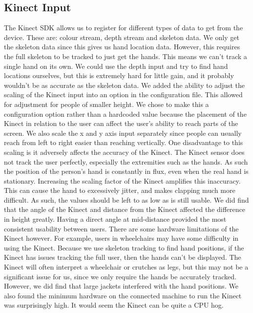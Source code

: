 \subsection{Kinect Input}
The Kinect SDK allows us to register for different types of data to get from the device. These are: colour stream, depth stream and skeleton data. We only get the skeleton data since this gives us hand location data. However, this requires the full skeleton to be tracked to just get the hands. This means we can't track a single hand on its own. We could use the depth input and try to find hand locations ourselves, but this is extremely hard for little gain, and it probably wouldn't be as accurate as the skeleton data.
We added the ability to adjust the scaling of the Kinect input into an option in the configuration file. This allowed for adjustment for people of smaller height. We chose to make this a configuration option rather than a hardcoded value because the placement of the Kinect in relation to the user can affect the user's ability to reach parts of the screen. We also scale the x and y axis input separately since people can usually reach from left to right easier than reaching vertically.
One disadvantage to this scaling is it adversely affects the accuracy of the Kinect. The Kinect sensor does not track the user perfectly, especially the extremities such as the hands. As such the position of the person's hand is constantly in flux, even when the real hand is stationary. Increasing the scaling factor of the Kinect amplifies this inaccuracy. This can cause the hand to excessively jitter, and makes clapping much more difficult. As such, the values should be left to as low as is still usable.
We did find that the angle of the Kinect and distance from the Kinect affected the difference in height greatly. Having a direct angle at mid-distance provided the most consistent usability between users.
There are some hardware limitations of the Kinect however. For example, users in wheelchairs may have some difficulty in using the Kinect. Because we use skeleton tracking to find hand positions, if the Kinect has issues tracking the full user, then the hands can't be displayed. The Kinect will often interpret a wheelchair or crutches as legs, but this may not be a significant issue for us, since we only require the hands be accurately tracked. However, we did find that large jackets interfered with the hand positions.
We also found the minimum hardware on the connected machine to run the Kinect was surprisingly high. It would seem the Kinect can be quite a CPU hog.

